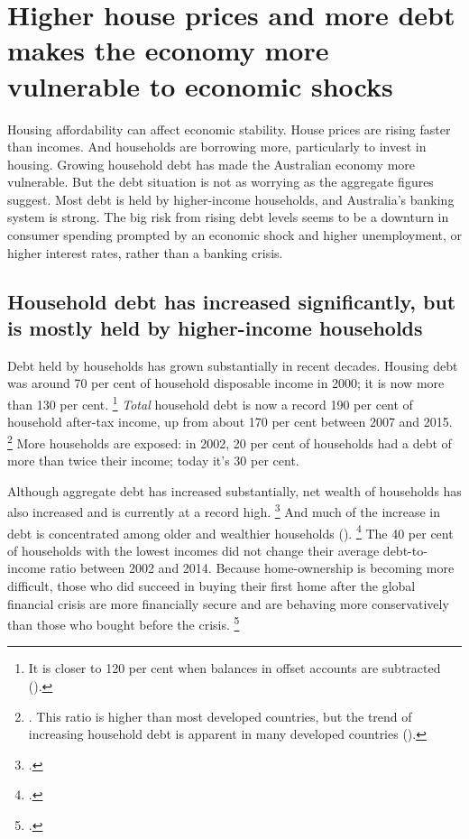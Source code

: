 \section{Higher house prices and more debt makes the economy more vulnerable to economic shocks}\label{sec:higher-house-prices-and-more-debt-makes-the-economy-more-vulnerable-to-economic-shocks}

Housing affordability can affect economic stability.
House prices are rising faster than incomes.
And households are borrowing more, particularly to invest in housing.
Growing household debt has made the Australian economy more vulnerable.
But the debt situation is not as worrying as the aggregate figures suggest.
Most debt is held by higher-income households, and Australia's banking system is strong.
The big risk from rising debt levels seems to be a downturn in consumer spending prompted by an economic shock and higher unemployment, or higher interest rates, rather than a banking crisis.

\subsection{Household debt has increased significantly, but is mostly held by higher-income households}\label{subsec:household-debt-has-increased-significantly-but-is-mostly-held-by-higher-income-households}

Debt held by households has grown substantially in recent decades.
Housing debt was around 70 per cent of household disposable income in 2000; it is now more than 130 per cent.%
	\footnote{It is closer to 120 per cent when balances in offset accounts are subtracted (\textcite[][Graph~2.5]{RBAFinancialStabilityOct2017}).}
\emph{Total} household debt is now a record 190 per cent of household after-tax income, up from about 170 per cent between 2007 and 2015.%
	\footnote{\textcite{RBA2017selectedratios-e2}.
	This ratio is higher than most developed countries, but the trend of increasing household debt is apparent in many developed countries (\textcite[][Figure~1]{Simon-Stone-2017-Property-Ladder}).}
More households are exposed: in 2002, 20 per cent of households had a debt of more than twice their income; today it's 30 per cent.

Although aggregate debt has increased substantially, net wealth of households has also increased and is currently at a record high.%
	\footcites{Lowe2017Householddebt}{ABS-2017-HouseholdIncomeAndWealth-201516}
And much of the increase in debt is concentrated among older and wealthier households ().%
	\footcite{Lowe2017Householddebt}
The 40 per cent of households with the lowest incomes did not change their average debt-to-income ratio between 2002 and 2014.
Because home-ownership is becoming more difficult, those who did succeed in buying their first home after the global financial crisis are more financially secure and are behaving more conservatively than those who bought before the crisis.%
	\footcite{Simon-Stone-2017-Property-Ladder}

